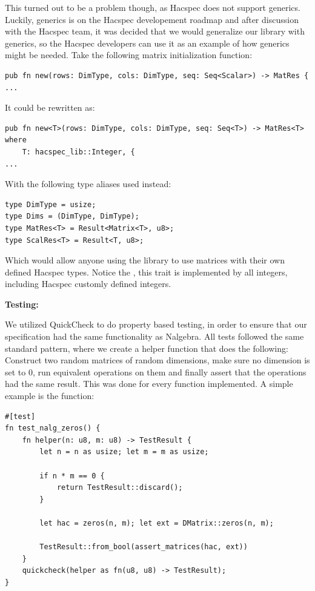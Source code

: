 \documentclass{article}
\newcommand*\ttvar[1]{\texttt{\expandafter\dottvar\detokenize{#1}\relax}}
\newcommand*\dottvar[1]{\ifx\relax#1\else
  \expandafter\ifx\string_#1\string_\allowbreak\else#1\fi
  \expandafter\dottvar\fi}
\begin{document}
This turned out to be a problem though, as Hacspec does not support
generics. Luckily, generics is on the Hacspec developement roadmap
and after discussion with the Hacspec team, it was decided that we
would generalize our library with generics, so the Hacspec developers
can use it as an example of how generics might be needed. Take the
following matrix initialization function:

\begin{lstlisting}
pub fn new(rows: DimType, cols: DimType, seq: Seq<Scalar>) -> MatRes {
...
\end{lstlisting}

It could be rewritten as:

\begin{lstlisting}
pub fn new<T>(rows: DimType, cols: DimType, seq: Seq<T>) -> MatRes<T>
where
	T: hacspec_lib::Integer, {
...
\end{lstlisting}

With the following type aliases used instead:

\begin{lstlisting}
type DimType = usize;
type Dims = (DimType, DimType);
type MatRes<T> = Result<Matrix<T>, u8>;
type ScalRes<T> = Result<T, u8>;
\end{lstlisting}

Which would allow anyone using the library to use matrices with their
own defined Hacspec types. Notice the \ttvar{hacspec_lib::Integer},
this trait is implemented by all integers, including Hacspec customly
defined integers.

\newpage

\textbf{Testing:}

We utilized QuickCheck to do property based testing, in order to ensure
that our specification had the same functionality as Nalgebra. All
tests followed the same standard pattern, where we create a helper
function that does the following: Construct two random matrices of
random dimensions, make sure no dimension is set to 0, run equivalent
operations on them and finally assert that the operations had the same
result. This was done for every function implemented. A simple example
is the \ttvar{zeros()} function:

\begin{lstlisting}
#[test]
fn test_nalg_zeros() {
	fn helper(n: u8, m: u8) -> TestResult {
		let n = n as usize; let m = m as usize;

		if n * m == 0 {
		    return TestResult::discard();
		}

		let hac = zeros(n, m); let ext = DMatrix::zeros(n, m);

		TestResult::from_bool(assert_matrices(hac, ext))
	}
	quickcheck(helper as fn(u8, u8) -> TestResult);
}
\end{lstlisting}
\end{document}
